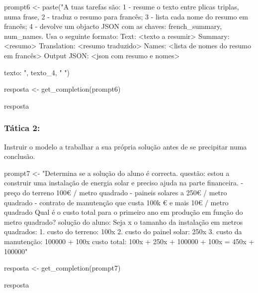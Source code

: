 \documentclass[
  letterpaper,
  paper=6in:9in,
  pagesize=pdftex,
  headinclude=on,
  footinclude=on,
  12pt]{scrbook}
\newenvironment{Shaded}{\begin{snugshade}}{\end{snugshade}}
\newcommand{\FunctionTok}[1]{\textcolor[rgb]{0.28,0.35,0.67}{#1}}
\newcommand{\NormalTok}[1]{\textcolor[rgb]{0.00,0.23,0.31}{#1}}
\newcommand{\OtherTok}[1]{\textcolor[rgb]{0.00,0.23,0.31}{#1}}
\newcommand{\StringTok}[1]{\textcolor[rgb]{0.13,0.47,0.30}{#1}}
\begin{document}
\begin{Shaded}
\begin{Highlighting}[]
\NormalTok{prompt6 }\OtherTok{\textless{}{-}} \FunctionTok{paste}\NormalTok{(}\StringTok{"A tuas tarefas são:}
\StringTok{                1 {-} resume o texto entre plicas triplas, numa frase,}
\StringTok{                2 {-} traduz o resumo para francês;}
\StringTok{                3 {-} lista cada nome do resumo em francês;}
\StringTok{                4 {-} devolve um objacto JSON com as chaves: french\_summary, num\_names.}
\StringTok{                Usa o seguinte formato:}
\StringTok{Text: \textless{}texto a resumir\textgreater{}}
\StringTok{Summary: \textless{}resumo\textgreater{}}
\StringTok{Translation: \textless{}resumo traduzido\textgreater{}}
\StringTok{Names: \textless{}lista de nomes do resumo em francês\textgreater{}}
\StringTok{Output JSON: \textless{}json com resumo e nomes\textgreater{}}

\StringTok{texto: \textquotesingle{}\textquotesingle{}\textquotesingle{} "}\NormalTok{, texto\_4, }\StringTok{"\textquotesingle{}\textquotesingle{}\textquotesingle{} "}\NormalTok{)}

\NormalTok{resposta }\OtherTok{\textless{}{-}} \FunctionTok{get\_completion}\NormalTok{(prompt6)}

\NormalTok{resposta}
\end{Highlighting}
\end{Shaded}

\hypertarget{tuxe1tica-2}{%
\subsubsection{Tática 2:}\label{tuxe1tica-2}}

Instruir o modelo a trabalhar a sua própria solução antes de se
precipitar numa conclusão.

\begin{Shaded}
\begin{Highlighting}[]
\NormalTok{prompt7 }\OtherTok{\textless{}{-}} \StringTok{"Determina se a solução do aluno é correcta.}
\StringTok{questão: estou a construir uma instalação de energia solar e preciso ajuda na parte financeira.}
\StringTok{{-} preço do terreno 100€ / metro quadrado}
\StringTok{{-} paineis solares a 250€ / metro quadrado}
\StringTok{{-} contrato de manutenção que custa 100k € e mais 10€ / metro quadrado}
\StringTok{Qual é o custo total para o primeiro ano em produção em função do metro quadrado?}
\StringTok{solução do aluno: Seja x o tamanho da instalação em metros quadrados:}
\StringTok{1. custo do terreno: 100x}
\StringTok{2. custo do painel solar: 250x}
\StringTok{3. custo da manutenção: 100000 + 100x}
\StringTok{custo total: 100x + 250x + 100000 + 100x = 450x + 100000"}

\NormalTok{resposta }\OtherTok{\textless{}{-}} \FunctionTok{get\_completion}\NormalTok{(prompt7)}

\NormalTok{resposta}
\end{Highlighting}
\end{Shaded}
\end{document}
